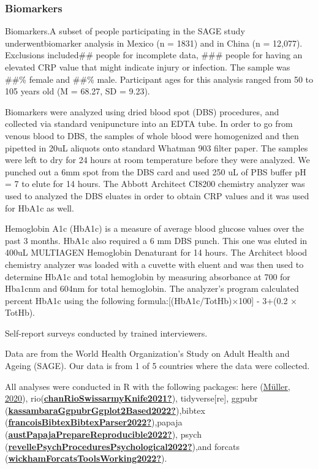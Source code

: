 \documentclass[
  man]{apa6}
\begin{document}
\hypertarget{biomarkers}{%
\subsubsection{Biomarkers}\label{biomarkers}}

Biomarkers.A subset of people participating in the SAGE study underwentbiomarker analysis in Mexico (n = 1831) and in China (n = 12,077). Exclusions included\#\# people for incomplete data, \#\#\# people for having an elevated CRP value that might indicate injury or infection. The sample was \#\#\% female and \#\#\% male. Participant ages for this analysis ranged from 50 to 105 years old (M = 68.27, SD = 9.23).

Biomarkers were analyzed using dried blood spot (DBS) procedures, and collected via standard venipuncture into an EDTA tube. In order to go from venous blood to DBS, the samples of whole blood were homogenized and then pipetted in 20uL aliquots onto standard Whatman 903 filter paper. The samples were left to dry for 24 hours at room temperature before they were analyzed. We punched out a 6mm spot from the DBS card and used 250 uL of PBS buffer pH = 7 to elute for 14 hours. The Abbott Architect CI8200 chemistry analyzer was used to analyzed the DBS eluates in order to obtain CRP values and it was used for HbA1c as well.

Hemoglobin A1c (HbA1c) is a measure of average blood glucose values over the past 3 months. HbA1c also required a 6 mm DBS punch. This one was eluted in 400uL MULTIAGEN Hemoglobin Denaturant for 14 hours. The Architect blood chemistry analyzer was loaded with a cuvette with eluent and was then used to determine HbA1c and total hemoglobin by measuring absorbance at 700 for Hba1cnm and 604nm for total hemoglobin. The analyzer's program calculated percent HbA1c using the following formula:{[}(HbA1c/TotHb)×100{]} - 3+(0.2 × TotHb).

Self-report surveys conducted by trained interviewers.

Data are from the World Health Organization's Study on Adult Health and Ageing (SAGE). Our data is from 1 of 5 countries where the data were collected.

All analyses were conducted in R with the following packages:
here (\protect\hyperlink{ref-here}{Müller, 2020}), rio(\protect\hyperlink{ref-chanRioSwissarmyKnife2021}{\textbf{chanRioSwissarmyKnife2021?}}), tidyverse{[}re{]}, ggpubr (\protect\hyperlink{ref-kassambaraGgpubrGgplot2Based2022}{\textbf{kassambaraGgpubrGgplot2Based2022?}}),bibtex (\protect\hyperlink{ref-francoisBibtexBibtexParser2022}{\textbf{francoisBibtexBibtexParser2022?}}),papaja (\protect\hyperlink{ref-austPapajaPrepareReproducible2022}{\textbf{austPapajaPrepareReproducible2022?}}), psych
(\protect\hyperlink{ref-revellePsychProceduresPsychological2022}{\textbf{revellePsychProceduresPsychological2022?}}),and forcats (\protect\hyperlink{ref-wickhamForcatsToolsWorking2022}{\textbf{wickhamForcatsToolsWorking2022?}}).
\end{document}
